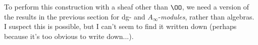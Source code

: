 \documentclass[12pt]{amsart}
\theoremstyle{definition}
\theoremstyle{remark}
\begin{document}
To perform this construction with a sheaf other than $\OO$, we need a version of the results in the previous section for dg- and $A_\infty$-\emph{modules}, rather than algebras. I suspect this is possible, but I can't seem to find it written down (perhaps because it's too obvious to write down...).




\end{document}
